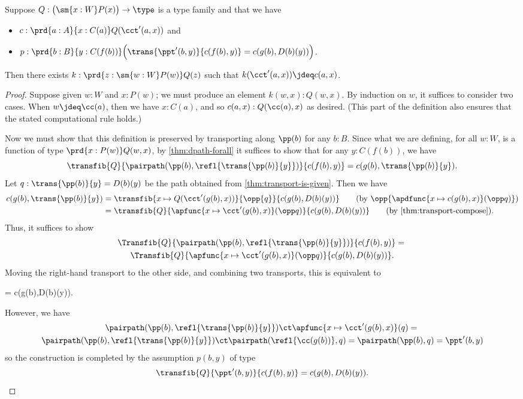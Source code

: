 \begin{lem}\label{thm:flattening-rect}
  Suppose $Q:\big(\sm{x:W} P(x)\big) \to \type$ is a type family and that we have
  \begin{itemize}
  \item $c : \prd{a:A}{x:C(a)} Q(\cct'(a,x))$ and
  \item $p : \prd{b:B}{y:C(f(b))} \Big(\trans{\ppt'(b,y)}{c(f(b),y)} = c(g(b),D(b)(y))\Big)$. %
  \end{itemize}
  Then there exists $k:\prd{z:\sm{w:W} P(w)} Q(z)$ such that $k(\cct'(a,x)) \jdeq c(a,x)$.
\end{lem}
\begin{proof}
  Suppose given $w:W$ and $x:P(w)$; we must produce an element $k(w,x):Q(w,x)$.
  By induction on $w$, it suffices to consider two cases.
  When $w\jdeq \cc(a)$, then we have $x:C(a)$, and so $c(a,x):Q(\cc(a),x)$ as desired.
  (This part of the definition also ensures that the stated computational rule holds.)

  Now we must show that this definition is preserved by transporting along $\pp(b)$ for any $b:B$.
  Since what we are defining, for all $w:W$, is a function of type $\prd{x:P(w)} Q(w,x)$, by \cref{thm:dpath-forall} it suffices to show that for any $y:C(f(b))$, we have
  \[ \transfib{Q}{\pairpath(\pp(b),\refl{\trans{\pp(b)}{y}})}{c(f(b),y)} = c(g(b),\trans{\pp(b)}{y}). \]
  Let $q:\trans{\pp(b)}{y} = D(b)(y)$ be the path obtained from \cref{thm:transport-is-given}.
  Then we have
  \begin{align}
    c(g(b),\trans{\pp(b)}{y})
    &= \transfib{x\mapsto Q(\cct'(g(b),x))}{\opp{q}}{c(g(b),D(b)(y))}
    \tag{by $\opp{\apdfunc{x\mapsto c(g(b),x)}(\opp q)}$} \\
    &= \transfib{Q}{\apfunc{x\mapsto \cct'(g(b),x)}(\opp q)}{c(g(b),D(b)(y))}
    \tag{by \cref{thm:transport-compose}}.
  \end{align}
  Thus, it suffices to show
  \begin{multline*}
    \Transfib{Q}{\pairpath(\pp(b),\refl{\trans{\pp(b)}{y}})}{c(f(b),y)} = {}\\
    \Transfib{Q}{\apfunc{x\mapsto \cct'(g(b),x)}(\opp q)}{c(g(b),D(b)(y))}.
  \end{multline*}
  Moving the right-hand transport to the other side, and combining two transports, this is equivalent to
  \begin{narrowmultline*}
     =
    \narrowbreak
    c(g(b),D(b)(y)).
  \end{narrowmultline*}
  However, we have
  \begin{multline*}
    \pairpath(\pp(b),\refl{\trans{\pp(b)}{y}}) \ct \apfunc{x\mapsto \cct'(g(b),x)}(q)
    = {} \\
    \pairpath(\pp(b),\refl{\trans{\pp(b)}{y}}) \ct \pairpath(\refl{\cc(g(b))},q)
    = \pairpath(\pp(b),q)
    = \ppt'(b,y)
  \end{multline*}
  so the construction is completed by the assumption $p(b,y)$ of type
  \[ \transfib{Q}{\ppt'(b,y)}{c(f(b),y)} = c(g(b),D(b)(y)). \qedhere \]
\end{proof}

